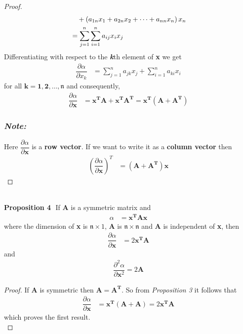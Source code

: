 \documentclass[14pt]{extarticle}
\begin{document}
\begin{flushleft}
\begin{large}
\begin{proof}
\begin{align}
&\,\,\,\,\,\,+ \left(a_{1n}x_1 + a_{2n}x_2 + \cdots + a_{nn}x_n\right)x_n {\notag} \\
&= \sum_{j=1}^{n}\sum_{i=1}^{n}a_{ij}x_ix_j
\end{align}
Differentiating with respect to the \emph{\textbf{k}}th element of \textbf{x} we get
\begin{align}
\dfrac{\partial \alpha}{\partial x_k} &= \sum_{j=1}^{n}a_{jk}x_j + \sum_{i=1}^{n}a_{ki}x_i
\end{align}
for all $\mathbf{k = 1,2,\ldots,\mathfrak{n}}$ and consequently,
\begin{align}
\dfrac{\partial \alpha}{\partial \mathbf{x}} &= \mathbf{x^TA} + \mathbf{x^TA^T} = \mathbf{x^T\left(A+A^T\right)}
\end{align}
\subsubsection*{\emph{Note:}}
Here $\dfrac{\partial \alpha}{\partial \mathbf{x}}$ is a \textbf{row vector}. If we want to write it as a \textbf{column vector} then
\begin{align}
\left(\dfrac{\partial \alpha}{\partial \mathbf{x}}\right)^T &= \mathbf{\left(A+A^T\right)x}
\end{align}
\end{proof}
 \\
\hfill \break
\hfill \break
\textbf{Proposition 4} \,\,If $\mathbf{A}$ is a symmetric matrix and
\begin{align}
\alpha &= \mathbf{x^TAx}
\end{align}
where the dimension of \textbf{x} is $\mathfrak{n} \times 1$, \textbf{A} is $\mathfrak{n} \times \mathfrak{n}$ and \textbf{A} is independent of \textbf{x}, then
\begin{align}
\dfrac{\partial \alpha}{\partial \mathbf{x}} &= 2\mathbf{x^TA}
\end{align}
and
\begin{align}
\dfrac{\partial^2 \alpha}{\partial \mathbf{x}^2} = 2\mathbf{A}
\end{align}
\begin{proof}
If $\mathbf{A}$ is symmetric then $\mathbf{A = A^T}$. So from \emph{Proposition 3} it follows that
\begin{align}
\dfrac{\partial \alpha}{\partial \mathbf{x}} &= \mathbf{x^T\left(A+A\right)} = 2\mathbf{x^TA}
\end{align}
which proves the first result. \\ 
\hfill \break

\end{proof}
\end{large}
\end{flushleft}
\end{document}
